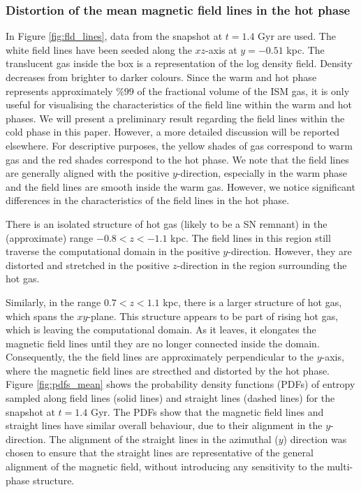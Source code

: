\documentclass[useAMS,usenatbib]{mn2e}
\begin{document}
\subsubsection{Distortion of the mean magnetic field lines in the hot phase}
In Figure \ref{fig:fld_lines}, data from the snapshot at $t=1.4$ Gyr are used. The white field lines have been seeded along the $xz$-axis at $y=-0.51$ kpc. The translucent gas inside the box is a representation of the log density field. Density decreases from brighter to darker colours.  
Since the warm and hot phase represents approximately $\%99$ of the fractional
volume of the ISM gas, it is only useful for visualising the characteristics 
of the field line within the warm and hot phases. 
We will present a preliminary result regarding the field lines within the 
cold phase in this paper. 
However, a more detailed discussion will be reported elsewhere. 
For descriptive purposes, the yellow shades of gas correspond to warm gas and 
the red shades correspond to the hot phase. 
We note that the field lines are generally aligned with the positive 
$y$-direction, especially in the warm phase and the field lines are smooth 
inside the warm gas. 
However, we notice significant differences in the characteristics of the 
field lines in the hot phase.
 
There is an isolated structure of hot gas (likely to be a SN remnant) in the
(approximate) range $-0.8<z<-1.1$ kpc. 
The field lines in this region still traverse the computational domain in the 
positive $y$-direction. 
However, they are distorted and stretched in the positive $z$-direction in 
the region surrounding the hot gas.
  
Similarly, in the range $0.7<z<1.1$ kpc, there is a larger structure of hot 
gas, which spans the $xy$-plane. 
This structure appears to be part of rising hot gas, which is leaving the 
computational domain. As it leaves, it elongates the magnetic field lines 
until they are no longer connected inside the domain. 
Consequently, the the field lines are approximately perpendicular to the 
$y$-axis, where the magnetic field lines are strecthed and distorted by the 
hot phase.
\noindent Figure \ref{fig:pdfs_mean} shows the probability density functions (PDFs) of 
entropy sampled along field lines (solid lines) and straight lines (dashed
lines) for the snapshot at $t=1.4$ Gyr. 
The PDFs show that the magnetic field lines and straight lines have similar 
overall behaviour, due to their alignment in the $y$-direction. 
The alignment of the straight lines in the azimuthal ($y$) direction was 
chosen to ensure that the straight lines are representative of the general 
alignment of the magnetic field, without introducing any sensitivity to the 
multi-phase structure.
\end{document}
